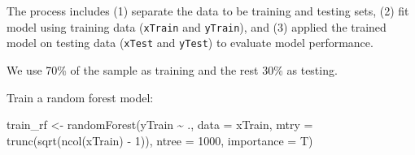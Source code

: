 \documentclass[
  12pt,
]{krantz}
\makeatletter
\newenvironment{Shaded}{\begin{snugshade}}{\end{snugshade}}
\newcommand{\AttributeTok}[1]{\textcolor[rgb]{0.61,0.61,0.61}{#1}}
\newcommand{\CommentTok}[1]{\textcolor[rgb]{0.37,0.37,0.37}{\textit{#1}}}
\newcommand{\DecValTok}[1]{\textcolor[rgb]{0.06,0.06,0.06}{#1}}
\newcommand{\FloatTok}[1]{\textcolor[rgb]{0.06,0.06,0.06}{#1}}
\newcommand{\FunctionTok}[1]{\textcolor[rgb]{0,0,0}{#1}}
\newcommand{\NormalTok}[1]{#1}
\newcommand{\OtherTok}[1]{\textcolor[rgb]{0.37,0.37,0.37}{#1}}
\newcommand{\SpecialCharTok}[1]{\textcolor[rgb]{0,0,0}{#1}}
\newenvironment{kframe}{%
\medskip{}
\setlength{\fboxsep}{.8em}
 \def\at@end@of@kframe{}%
 \ifinner\ifhmode%
  \def\at@end@of@kframe{\end{minipage}}%
  \begin{minipage}{\columnwidth}%
 \fi\fi%
 \def\FrameCommand##1{\hskip\@totalleftmargin \hskip-\fboxsep
 \colorbox{shadecolor}{##1}\hskip-\fboxsep
     \hskip-\linewidth \hskip-\@totalleftmargin \hskip\columnwidth}%
 \MakeFramed {\advance\hsize-\width
   \@totalleftmargin\z@ \linewidth\hsize
   \@setminipage}}%
 {\par\unskip\endMakeFramed%
 \at@end@of@kframe}
\renewenvironment{Shaded}{\begin{kframe}}{\end{kframe}}
\makeatother
\begin{document}
The process includes (1) separate the data to be training and testing sets, (2) fit model using training data (\texttt{xTrain} and \texttt{yTrain}), and (3) applied the trained model on testing data (\texttt{xTest} and \texttt{yTest}) to evaluate model performance.

We use 70\% of the sample as training and the rest 30\% as testing.

\begin{Shaded}
\end{Shaded}

Train a random forest model:

\begin{Shaded}
\begin{Highlighting}[]
\NormalTok{train\_rf }\OtherTok{\textless{}{-}} \FunctionTok{randomForest}\NormalTok{(yTrain }\SpecialCharTok{\textasciitilde{}}\NormalTok{ ., }
                         \AttributeTok{data =}\NormalTok{ xTrain, }
                         \AttributeTok{mtry =} \FunctionTok{trunc}\NormalTok{(}\FunctionTok{sqrt}\NormalTok{(}\FunctionTok{ncol}\NormalTok{(xTrain) }\SpecialCharTok{{-}} \DecValTok{1}\NormalTok{)),}
                         \AttributeTok{ntree =} \DecValTok{1000}\NormalTok{, }
                         \AttributeTok{importance =}\NormalTok{ T)}
\end{Highlighting}
\end{Shaded}
\end{document}
